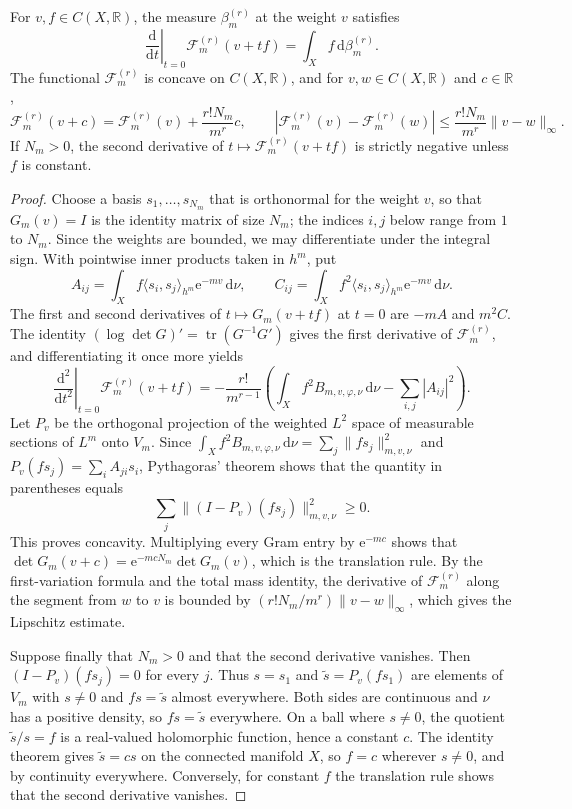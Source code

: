\begin{proposition}\label{prop:partial-kernel-variation}
For $v,f\in C(X,\mathbb R)$, the measure $\beta_m^{(r)}$ at the weight $v$ satisfies
\[
 \left.\frac{\mathrm{d}}{\mathrm{d}t}\right|_{t=0}\mathcal F_m^{(r)}(v+tf)
       =\int_X f\,\mathrm{d}\beta_m^{(r)}.
\]
The functional $\mathcal F_m^{(r)}$ is concave on $C(X,\mathbb R)$, and for $v,w\in C(X,\mathbb R)$ and $c\in\mathbb R$,
\[
 \mathcal F_m^{(r)}(v+c)=\mathcal F_m^{(r)}(v)
                         +\frac{r!N_m}{m^r}c,
 \qquad
 |\mathcal F_m^{(r)}(v)-\mathcal F_m^{(r)}(w)|
       \leq\frac{r!N_m}{m^r}\|v-w\|_\infty.
\]
If $N_m>0$, the second derivative of $t\mapsto\mathcal F_m^{(r)}(v+tf)$ is strictly negative unless $f$ is constant.
\end{proposition}
\begin{proof}
Choose a basis $s_1,\ldots,s_{N_m}$ that is orthonormal for the weight $v$, so that $G_m(v)=I$ is the identity matrix of size $N_m$; the indices $i,j$ below range from $1$ to $N_m$. Since the weights are bounded, we may differentiate under the integral sign. With pointwise inner products taken in $h^m$, put
\[
 A_{ij}=\int_X f\langle s_i,s_j\rangle_{h^m}\mathrm{e}^{-mv}\,\mathrm{d}\nu,
 \qquad
 C_{ij}=\int_X f^2\langle s_i,s_j\rangle_{h^m}\mathrm{e}^{-mv}\,\mathrm{d}\nu.
\]
The first and second derivatives of $t\mapsto G_m(v+tf)$ at $t=0$ are $-mA$ and $m^2C$. The identity
$(\log\det G)'=\operatorname{tr}(G^{-1}G')$ gives the first derivative of $\mathcal F_m^{(r)}$, and differentiating it once more yields
\[
 \left.\frac{\mathrm{d}^2}{\mathrm{d}t^2}\right|_{t=0}\mathcal F_m^{(r)}(v+tf)
 =-\frac{r!}{m^{r-1}}
       \left(\int_X f^2B_{m,v,\varphi,\nu}\,\mathrm{d}\nu
                     -\sum_{i,j}|A_{ij}|^2\right).
\]
Let $P_v$ be the orthogonal projection of the weighted $L^2$ space of measurable sections of $L^m$ onto $V_m$. Since $\int_Xf^2B_{m,v,\varphi,\nu}\,\mathrm{d}\nu=\sum_j\|fs_j\|_{m,v,\nu}^2$ and $P_v(fs_j)=\sum_iA_{ji}s_i$, Pythagoras' theorem shows that the quantity in parentheses equals
\[
 \sum_j\|(I-P_v)(fs_j)\|_{m,v,\nu}^2\geq0.
\]
This proves concavity. Multiplying every Gram entry by $\mathrm{e}^{-mc}$ shows that $\det G_m(v+c)=\mathrm{e}^{-mcN_m}\det G_m(v)$, which is the translation rule. By the first-variation formula and the total mass identity, the derivative of $\mathcal F_m^{(r)}$ along the segment from $w$ to $v$ is bounded by $(r!N_m/m^r)\|v-w\|_\infty$, which gives the Lipschitz estimate.

Suppose finally that $N_m>0$ and that the second derivative vanishes. Then $(I-P_v)(fs_j)=0$ for every $j$. Thus $s=s_1$ and $\widetilde s=P_v(fs_1)$ are elements of $V_m$ with $s\ne0$ and $fs=\widetilde s$ almost everywhere. Both sides are continuous and $\nu$ has a positive density, so $fs=\widetilde s$ everywhere. On a ball where $s\ne0$, the quotient $\widetilde s/s=f$ is a real-valued holomorphic function, hence a constant $c$. The identity theorem gives $\widetilde s=cs$ on the connected manifold $X$, so $f=c$ wherever $s\neq0$, and by continuity everywhere. Conversely, for constant $f$ the translation rule shows that the second derivative vanishes.
\end{proof}

